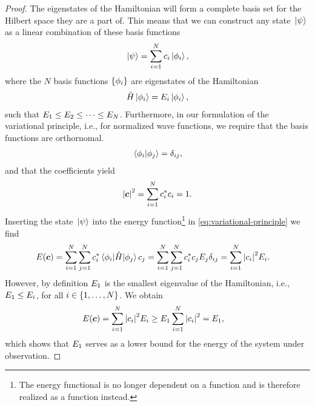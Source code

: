         \begin{proof}
            The eigenstates of the Hamiltonian will form a complete basis set
            for the Hilbert space they are a part of.
            This means that we can construct any state $\ket*{\psi}$ as a linear
            combination of these basis functions
            \begin{align}
                \ket*{\psi} = \sum_{i = 1}^{N} c_{i}\ket*{\phi_i},
            \end{align}
            where the $N$ basis functions $\left\{ \phi_i \right\}$ are eigenstates of the
            Hamiltonian
            \begin{align}
                \hat{H}\ket{\phi_i} = E_i\ket{\phi_i},
            \end{align}
            such that $E_1 \leq E_2 \leq \dots \leq E_N$.
            Furthermore, in our formulation of the variational principle, i.e.,
            for normalized wave functions, we require that the basis functions
            are orthornomal.
            \begin{align}
                \braket*{\phi_i}{\phi_j} = \delta_{ij},
            \end{align}
            and that the coefficients yield
            \begin{align}
                \abs{\boldsymbol{c}}^2 = \sum_{i = 1}^{N} c^{*}_{i}c_{i} = 1.
            \end{align}
            Inserting the state $\ket*{\psi}$ into the energy
            function\footnote{%
                The energy functional is no longer dependent on a function and
                is therefore realized as a function instead.
            } in \autoref{eq:variational-principle} we find
            \begin{align}
                E(\boldsymbol{c})
                &= \sum_{i = 1}^{N}\sum_{j = 1}^{N}
                c^{*}_i\mel*{\phi_i}{\hat{H}}{\phi_j}c_j
                = \sum_{i = 1}^{N}\sum_{j = 1}^{N}
                c^{*}_i c_j E_j\delta_{ij}
                = \sum_{i = 1}^{N}
                \abs{c_i}^2 E_i.
            \end{align}
            However, by definition $E_1$ is the smallest eigenvalue of the
            Hamiltonian, i.e., $E_1 \leq E_i$, for all $i \in
            \left\{ 1, \dots, N \right\}$.
            We obtain
            \begin{align}
                E(\boldsymbol{c})
                &= \sum_{i = 1}^{N}
                \abs{c_i}^2 E_i
                \geq
                E_1 \sum_{i = 1}^{N}
                \abs{c_i}^{2}
                = E_1,
            \end{align}
            which shows that $E_1$ serves as a lower bound for the energy
            of the system under observation.
        \end{proof}


